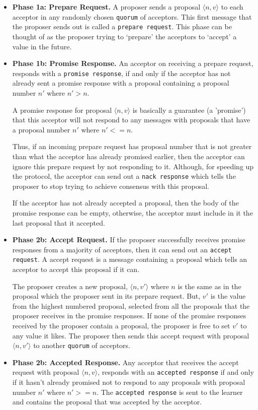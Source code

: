 \begin{itemize}
  \item \textbf{Phase 1a: Prepare Request.}
    A proposer sends a proposal
    $\langle n, v \rangle$ to each acceptor in any randomly chosen \texttt{quorum} of acceptors.
    This first message that the proposer sends out is called a \texttt{prepare request}.
    This phase can be thought of as the proposer trying to
    `prepare' the acceptors to `accept' a value in the future.
  \item \textbf{Phase 1b: Promise Response.}
    An acceptor on receiving a prepare request, responds with a \texttt{promise response},
    if and only if the acceptor has not already sent a promise response with
    a proposal containing a proposal number $n'$ where $n' > n$.

    A promise response for proposal $\langle n, v \rangle$ is basically a
    guarantee (a 'promise') that this acceptor will not respond to any
    messages with proposals that have a proposal number $n'$ where $n' <= n$.

    Thus, if an incoming prepare request has proposal number that is not
    greater than what the
    acceptor has already promised earlier, then the acceptor can ignore this
    prepare request by not responding to it. Although, for speeding up the
    protocol, the acceptor can send out a \texttt{nack response} which tells the
    proposer to stop trying to achieve consensus with this proposal.

    If the acceptor has not already accepted a proposal, then the body of
    the promise response can be empty, otherwise, the acceptor must include in it the
    last proposal that it accepted.
  \item \textbf{Phase 2b: Accept Request.}
    If the proposer successfully receives promise responses from a majority of
    acceptors, then it can send out an \texttt{accept request}. A accept request is
    a message containing a proposal which tells an acceptor to accept this
    proposal if it can.

    The proposer creates a new proposal, $\langle n, v' \rangle$ where $n$ is
    the same as in the proposal which the proposer sent in its prepare request.
    But, $v'$ is the value from the highest numbered proposal, selected from all
    the proposals that the proposer receives in the promise responses.
    If none of the promise responses received by the proposer contain a proposal,
    the proposer is free to set $v'$ to any value it likes.
    The proposer then sends this accept request with proposal $\langle n, v' \rangle$
    to another \texttt{quorum} of acceptors.
  \item \textbf{Phase 2b: Accepted Response.}
    Any acceptor that receives the accept request with proposal $\langle n, v \rangle$,
    responds with an \texttt{accepted response} if and only if it hasn't already promised
    not to respond to any proposals with proposal number $n'$ where $n' >= n$.
    The \texttt{accepted response} is sent to the learner and contains the proposal
    that was accepted by the acceptor.
\end{itemize}

